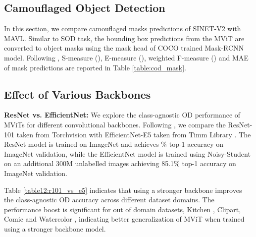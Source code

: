 \documentclass[runningheads]{llncs}
\begin{document}
\subsection{Camouflaged Object Detection}\label{app:add_results_cod}
In this section, we compare camouflaged masks predictions of SINET-V2 \cite{SINET-V2} with MAVL. Similar to SOD task, the bounding box predictions from the MViT are converted to object masks using the mask head of COCO \cite{coco} trained Mask-RCNN \cite{he2017mask} model. Following \cite{fan2020camouflaged}, S-measure (), E-measure (), weighted F-measure () and MAE of mask predictions are reported in Table \ref{table:cod_mask}.

\subsection{Effect of Various Backbones}
\noindent \textbf{ResNet vs. EfficientNet:}
We explore the class-agnostic OD performance of MViTs for different convolutional backbones. Following \cite{mdetr}, we compare the ResNet-101 \cite{he2016deep} taken from Torchvision with EfficientNet-E5 \cite{tan2019efficientnet} taken from Timm Library \cite{rw2019timm}. The ResNet model is trained on ImageNet \cite{russakovsky2015imagenet} and achieves \% top-1 accuracy on ImageNet validation, while the EfficientNet model is trained using Noisy-Student \cite{noisy_student} on an additional 300M unlabelled images achieving 85.1\% top-1 accuracy on ImageNet validation.

Table \ref{table12:r101_vs_e5} indicates that using a stronger backbone improves the class-agnostic OD accuracy across different dataset domains. The performance boost is significant for out of domain datasets, Kitchen \cite{kitchen}, Clipart, Comic and Watercolor \cite{clipart-comic-water}, indicating better generalization of MViT when trained using a stronger backbone model.
\end{document}
